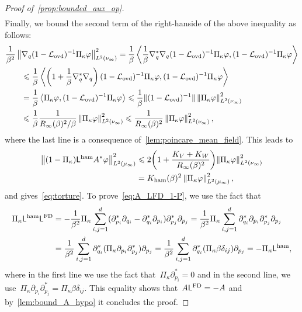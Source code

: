 \documentclass[onefignum,onetabnum]{siamart251216} %
\newcommand{\norm}[1]{\left\lVert#1\right\rVert}
\newcommand{\mc}[1]{\mathcal{#1}}
\renewcommand{\leq}{\leqslant}
\newcommand{\mescin}{\mu}
\newcommand{\mespos}{\nu}
\newcommand{\poinccu}{R_{\infty}(\beta)}
\newcommand{\projvit}{\Pi_{\kappa}}
\newcommand{\Lham}{\mathsf{L}^{\rm{ham}}}
\newcommand{\LFD}{\mathsf{L}^{\rm{FD}}}
\newcommand{\Lovd}{\mc{L}_{\rm{ovd}}}
\newcommand{\slangle}[1]{\left\langle #1 \right\rangle}
\newcommand{\norml}[1]{\norm{#1}_{L^2(\mescin_\infty)}}
\newcommand{\kham}{K_{\rm{ham}}(\beta)}
\theoremstyle{plain}
\numberwithin{equation}{section}
\numberwithin{theorem}{section}
\begin{document}
\begin{proof}[{Proof of~\cref{prop:bounded_aux_op}}]
\begin{align*}
\end{align*}
Finally, we bound the second term of the right-hanside of the above inequality as follows:
\begin{align*}
    &\frac{1}{\beta^2}\left\|\nabla_q (1-\Lovd)^{-1}\projvit\varphi\right\|_{L^2(\mespos_\infty)}^2
    = \frac1\beta\slangle{\frac{1}{\beta}\nabla_q^*\nabla_q (1-\Lovd)^{-1}\projvit\varphi, (1-\Lovd)^{-1}\projvit\varphi} \\
    &\qquad \leq \frac1\beta\slangle{\left(1+\frac{1}{\beta}\nabla_q^*\nabla_q\right) (1-\Lovd)^{-1}\projvit\varphi, (1-\Lovd)^{-1}\projvit\varphi} \\
    &\qquad = \frac1\beta\slangle{\projvit\varphi, (1-\Lovd)^{-1}\projvit\varphi} \leq \frac{1}{\beta}\|(1-\Lovd)^{-1}\|\left\|\projvit\varphi\right\|_{L^2(\mespos_\infty)}^2 \\
    &\qquad\leq \frac{1}{\beta} \frac{1}{\poinccu^2/\beta}\left\|\projvit\varphi\right\|_{L^2(\mespos_\infty)}^2 \leq \frac{1}{\poinccu^2}\left\|\projvit\varphi\right\|_{L^2(\mespos_\infty)}^2,
\end{align*}
where the last line is a consequence of~\cref{lem:poincare_mean_field}. This leads to
\begin{align*}
\norml{(1-\projvit)\Lham A^* \varphi}^2 &\leq 2\!\left(1+\frac{K_V+K_W}{\poinccu^2}\right)\!\left\|\projvit\varphi\right\|_{L^2(\mespos_\infty)}^2 \\
&= \kham^2 \norml{\projvit\varphi}^2,
\end{align*}
and gives~\eqref{eq:torture}.
To prove~\eqref{eq:A_LFD_1-P}, we use the fact that
\begin{align*}
    \projvit\Lham\LFD &= -\frac{1}{\beta^2}\projvit \sum_{i,j=1}^{d} (\partial^*_{p_i}\partial_{q_i} - \partial^*_{q_i}\partial_{p_i})\partial^*_{p_j}\partial_{p_j} = \frac{1}{\beta^2}\projvit \sum_{i,j=1}^{d} \partial^*_{q_i}\partial_{p_i}\partial^*_{p_j}\partial_{p_j} \\
    &=  \frac{1}{\beta^2}\sum_{i,j=1}^{d} \partial^*_{q_i}(\projvit\partial_{p_i}\partial^*_{p_j})\partial_{p_j} =
    \frac{1}{\beta^2}\sum_{i,j=1}^{d} \partial^*_{q_i}(\projvit \beta \delta_{ij})\partial_{p_j} = -\projvit\Lham,
\end{align*}
where in the first line we use the fact that~$\projvit\partial_{p_i}^* = 0$ and in the second line, we use~$\projvit\partial_{p_i}\partial^*_{p_j} = \projvit \beta \delta_{ij}$. This equality shows that~$A\LFD = -A$ and by~\cref{lem:bound_A_hypo} it concludes the proof.
\end{proof}
\end{document}
